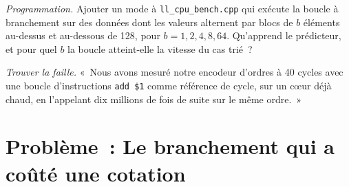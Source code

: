 \begin{exercise}[$\star\star\star$]\label{exo:ll:cpu-microarchitecture:7}
\emph{Programmation.} Ajouter un mode à \texttt{ll\_cpu\_bench.cpp} qui exécute la boucle à branchement sur des données dont les valeurs alternent par
blocs de $b$ éléments au-dessus et au-dessous de 128, pour $b = 1, 2, 4, 8, 64$. Qu'apprend le prédicteur, et pour quel $b$ la boucle atteint-elle la
vitesse du cas trié~?
\end{exercise}

\begin{exercise}[$\star\star\star$]\label{exo:ll:cpu-microarchitecture:8}
\emph{Trouver la faille.} «~Nous avons mesuré notre encodeur d'ordres à 40 cycles avec une boucle d'instructions \texttt{add \$1} comme
référence de cycle, sur un cœur déjà chaud, en l'appelant dix millions de fois de suite sur le même ordre.~»
\end{exercise}

\section{Problème~: Le branchement qui a coûté une cotation}

